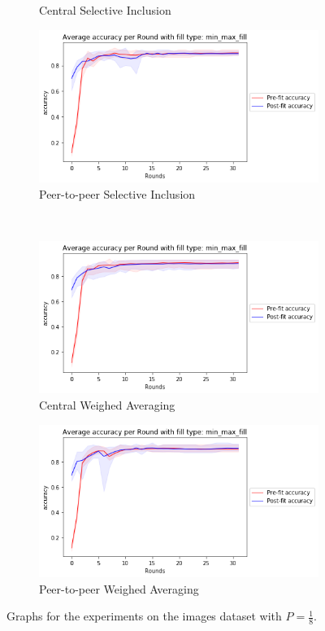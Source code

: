 \documentclass[12pt]{article}
\begin{document}
\begin{figure}[H]
\begin{subfigure}{0.45\textwidth}
    \caption{Central Selective Inclusion}
\end{subfigure}
\begin{subfigure}{0.45\textwidth}
    \raggedleft
    \includegraphics[width=\textwidth]{resources/posture_stdround_p2p-0.125-accuracy.png}
    \caption{Peer-to-peer Selective Inclusion}
\end{subfigure}
\\
\begin{subfigure}{0.45\textwidth}
    \raggedleft
    \includegraphics[width=\textwidth]{resources/posture_weightround-0.125-accuracy.png}
    \caption{Central Weighed Averaging}
\end{subfigure}
\begin{subfigure}{0.45\textwidth}
    \raggedleft
    \includegraphics[width=\textwidth]{resources/posture_weightround_p2p-0.125-accuracy.png}
    \caption{Peer-to-peer Weighed Averaging}
\end{subfigure}
\caption{Graphs for the experiments on the images dataset with $P = \tfrac{1}{8}$.}\label{fig:images_graphs_eq}
\end{figure}
\end{document}
